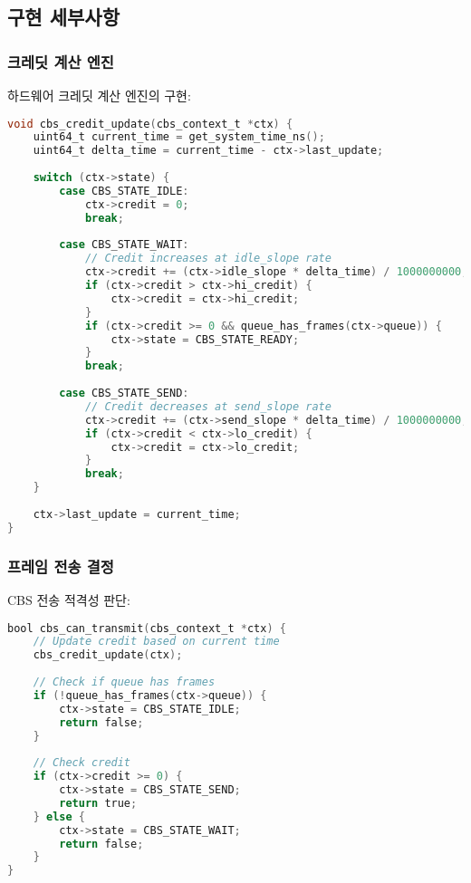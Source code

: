 \documentclass[twocolumn,10pt]{article}
\begin{document}
\subsection{구현 세부사항}

\subsubsection{크레딧 계산 엔진}

하드웨어 크레딧 계산 엔진의 구현:

\begin{lstlisting}[language=C, caption=크레딧 계산 알고리즘]
void cbs_credit_update(cbs_context_t *ctx) {
    uint64_t current_time = get_system_time_ns();
    uint64_t delta_time = current_time - ctx->last_update;
    
    switch (ctx->state) {
        case CBS_STATE_IDLE:
            ctx->credit = 0;
            break;
            
        case CBS_STATE_WAIT:
            // Credit increases at idle_slope rate
            ctx->credit += (ctx->idle_slope * delta_time) / 1000000000;
            if (ctx->credit > ctx->hi_credit) {
                ctx->credit = ctx->hi_credit;
            }
            if (ctx->credit >= 0 && queue_has_frames(ctx->queue)) {
                ctx->state = CBS_STATE_READY;
            }
            break;
            
        case CBS_STATE_SEND:
            // Credit decreases at send_slope rate
            ctx->credit += (ctx->send_slope * delta_time) / 1000000000;
            if (ctx->credit < ctx->lo_credit) {
                ctx->credit = ctx->lo_credit;
            }
            break;
    }
    
    ctx->last_update = current_time;
}
\end{lstlisting}

\subsubsection{프레임 전송 결정}

CBS 전송 적격성 판단:

\begin{lstlisting}[language=C, caption=전송 결정 알고리즘]
bool cbs_can_transmit(cbs_context_t *ctx) {
    // Update credit based on current time
    cbs_credit_update(ctx);
    
    // Check if queue has frames
    if (!queue_has_frames(ctx->queue)) {
        ctx->state = CBS_STATE_IDLE;
        return false;
    }
    
    // Check credit
    if (ctx->credit >= 0) {
        ctx->state = CBS_STATE_SEND;
        return true;
    } else {
        ctx->state = CBS_STATE_WAIT;
        return false;
    }
}
\end{lstlisting}
\end{document}
